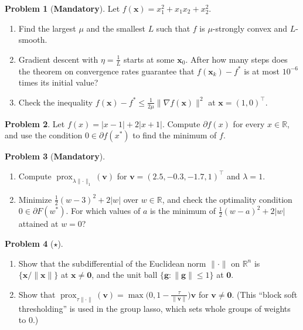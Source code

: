 \documentclass[11pt]{article}
\theoremstyle{definition}
\newtheorem{problem}{Problem}[section]
\newcommand{\mandatory}{\textcolor{red!70!black}{\textbf{Mandatory}}}
\newcommand{\norm}[1]{\lVert #1 \rVert}
\begin{document}
\begin{problem}[\mandatory]\label{pr:strong-convexity}
    Let $f(\mathbf{x}) = x_1^2 + x_1x_2 + x_2^2$.
    \begin{enumerate}[label=(\alph*)]
        \item Find the largest $\mu$ and the smallest $L$ such that $f$ is $\mu$-strongly convex and $L$-smooth.
        \item Gradient descent with $\eta = \frac{1}{L}$ starts at some $\mathbf{x}_0$. After how many steps does the theorem on convergence rates guarantee that $f(\mathbf{x}_k) - f^*$ is at most $10^{-6}$ times its initial value?
        \item Check the inequality $f(\mathbf{x}) - f^* \leq \frac{1}{2\mu}\norm{\nabla f(\mathbf{x})}^2$ at $\mathbf{x} = (1, 0)^\top$.
    \end{enumerate}
\end{problem}

\begin{problem}\label{pr:subgradient-practice}
    Let $f(x) = |x - 1| + 2|x + 1|$. Compute $\partial f(x)$ for every $x \in \mathbb{R}$, and use the condition $0 \in \partial f(x^*)$ to find the minimum of $f$.
\end{problem}

\begin{problem}[\mandatory]\label{pr:soft-threshold-practice}
    \begin{enumerate}[label=(\alph*)]
        \item Compute $\operatorname{prox}_{\lambda\norm{\cdot}_1}(\mathbf{v})$ for $\mathbf{v} = (2.5, -0.3, -1.7, 1)^\top$ and $\lambda = 1$.
        \item Minimize $\frac{1}{2}(w - 3)^2 + 2|w|$ over $w \in \mathbb{R}$, and check the optimality condition $0 \in \partial F(w^*)$. For which values of $a$ is the minimum of $\frac{1}{2}(w - a)^2 + 2|w|$ attained at $w = 0$?
    \end{enumerate}
\end{problem}

\begin{problem}[$\star$]\label{pr:group-lasso}
    \begin{enumerate}[label=(\alph*)]
        \item Show that the subdifferential of the Euclidean norm $\norm{\cdot}$ on $\mathbb{R}^n$ is $\{\mathbf{x}/\norm{\mathbf{x}}\}$ at $\mathbf{x} \neq \mathbf{0}$, and the unit ball $\{\mathbf{g} : \norm{\mathbf{g}} \leq 1\}$ at $\mathbf{0}$.
        \item Show that $\operatorname{prox}_{\tau\norm{\cdot}}(\mathbf{v}) = \max\big(0, 1 - \frac{\tau}{\norm{\mathbf{v}}}\big)\mathbf{v}$ for $\mathbf{v} \neq \mathbf{0}$. (This ``block soft thresholding'' is used in the group lasso, which sets whole groups of weights to $0$.)
    \end{enumerate}
\end{problem}
\end{document}

